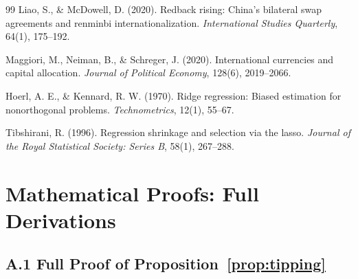 \documentclass[12pt, letterpaper]{article}
\theoremstyle{definition}
\begin{document}
\begin{thebibliography}{99}
Liao, S., \& McDowell, D. (2020).
\newblock Redback rising: China's bilateral swap agreements and renminbi internationalization.
\newblock \textit{International Studies Quarterly}, 64(1), 175--192.

Maggiori, M., Neiman, B., \& Schreger, J. (2020).
\newblock International currencies and capital allocation.
\newblock \textit{Journal of Political Economy}, 128(6), 2019--2066.

Hoerl, A. E., \& Kennard, R. W. (1970).
\newblock Ridge regression: Biased estimation for nonorthogonal problems.
\newblock \textit{Technometrics}, 12(1), 55--67.



Tibshirani, R. (1996).
\newblock Regression shrinkage and selection via the lasso.
\newblock \textit{Journal of the Royal Statistical Society: Series B}, 58(1), 267--288.

\end{thebibliography}

\newpage
\appendix
\section{Mathematical Proofs: Full Derivations}

\subsection*{A.1 Full Proof of Proposition~\ref{prop:tipping}}
\end{document}
